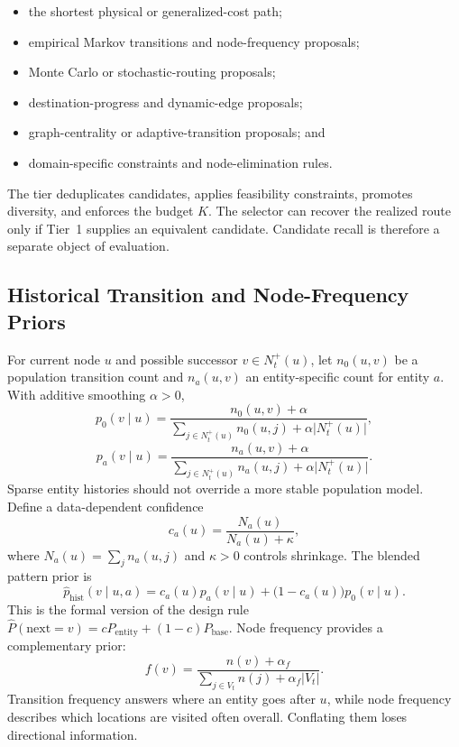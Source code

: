 \documentclass[11pt,letterpaper]{article}
\begin{document}
\begin{itemize}
  \item the shortest physical or generalized-cost path;
  \item empirical Markov transitions and node-frequency proposals;
  \item Monte Carlo or stochastic-routing proposals;
  \item destination-progress and dynamic-edge proposals;
  \item graph-centrality or adaptive-transition proposals; and
  \item domain-specific constraints and node-elimination rules.
\end{itemize}

The tier deduplicates candidates, applies feasibility constraints, promotes diversity, and enforces the budget $K$. The selector can recover the realized route only if Tier~1 supplies an equivalent candidate. Candidate recall is therefore a separate object of evaluation.

\subsection{Historical Transition and Node-Frequency Priors}

For current node $u$ and possible successor $v\in N_t^+(u)$, let $n_0(u,v)$ be a population transition count and $n_a(u,v)$ an entity-specific count for entity $a$. With additive smoothing $\alpha>0$,
\begin{equation}
p_0(v\mid u)=\frac{n_0(u,v)+\alpha}{\sum_{j\in N_t^+(u)}n_0(u,j)+\alpha\lvert N_t^+(u)\rvert},
\end{equation}
\begin{equation}
p_a(v\mid u)=\frac{n_a(u,v)+\alpha}{\sum_{j\in N_t^+(u)}n_a(u,j)+\alpha\lvert N_t^+(u)\rvert}.
\end{equation}
Sparse entity histories should not override a more stable population model. Define a data-dependent confidence
\begin{equation}
c_a(u)=\frac{N_a(u)}{N_a(u)+\kappa},
\end{equation}
where $N_a(u)=\sum_jn_a(u,j)$ and $\kappa>0$ controls shrinkage. The blended pattern prior is
\begin{equation}
\widehat p_{\mathrm{hist}}(v\mid u,a)
=c_a(u)p_a(v\mid u)+\bigl(1-c_a(u)\bigr)p_0(v\mid u).
\end{equation}
This is the formal version of the design rule $\widehat P(\text{next}=v)=cP_{\mathrm{entity}}+(1-c)P_{\mathrm{base}}$. Node frequency provides a complementary prior:
\begin{equation}
f(v)=\frac{n(v)+\alpha_f}{\sum_{j\in V_t}n(j)+\alpha_f\lvert V_t\rvert}.
\end{equation}
Transition frequency answers where an entity goes after $u$, while node frequency describes which locations are visited often overall. Conflating them loses directional information.
\end{document}
